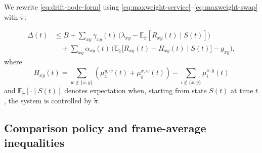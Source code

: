 \documentclass[11pt]{article}
\newcommand{\E}{\mathbb{E}}
\begin{document}
We rewrite \eqref{eq:drift-node-form} using \eqref{eq:maxweight-service}--\eqref{eq:maxweight-swap} with $\tilde\pi$:




\begin{equation}
\begin{aligned}
\Delta(t)
&\le B
+ \sum_{xy} \gamma_{xy}(t)\,
\big(\lambda_{xy} - \E_{\tilde\pi}[R_{xy}(t)\mid S(t)]\big)
\\
&\quad
+ \sum_{xy} \alpha_{xy}(t)\,
\Big(
\E_{\tilde\pi}\big[R_{xy}(t) + H_{xy}(t)  \mid S(t)
\big] - g_{xy}
\Big),
\end{aligned}
\label{eq:drift-pre-simplify}
\end{equation}
where 
\begin{equation}
H_{xy}(t) = \sum_{w\notin\{x,y\}}(\mu_x^{y,w}(t)+\mu_y^{x,w}(t))
- \sum_{i\notin\{x,y\}}\mu_i^{x,y}(t) 
\label{eq:H}
\end{equation}
and $\E_{\tilde\pi}[\cdot\mid S(t)]$ denotes expectation when,
starting from state $S(t)$ at time $t$, the system is controlled
by $\tilde \pi$.
\subsection{Comparison policy and frame-average inequalities} \label{sec:comparison}
\end{document}
